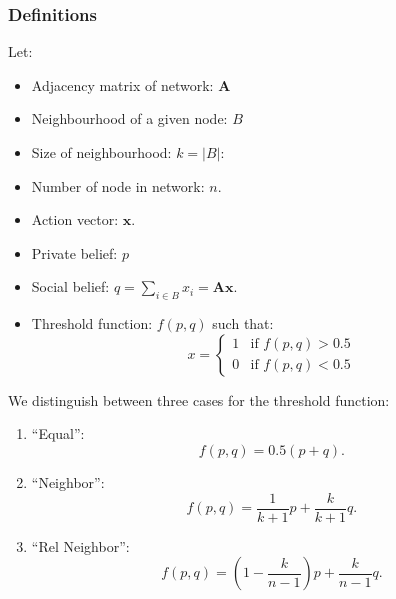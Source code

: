 \documentclass[10pt,a4paper]{article}
\author{Christoph Aymanns}
\begin{document}
\subsubsection*{Definitions}
Let:
\begin{itemize}
\item Adjacency matrix of network: $\mathbf{A}$
\item Neighbourhood of a given node: $B$ 
\item Size of neighbourhood: $k =|B|$: 
\item Number of node in network: $n$.
\item Action vector: $\mathbf{x}$.
\item Private belief: $p$ 
\item Social belief: $q = \sum_{i \in B} x_i = \mathbf{A} \mathbf{x}$. 
\item Threshold function: $f(p,q)$ such that:
\begin{equation}
x = \begin{cases} 1 &\mbox{if } f(p,q) > 0.5  \\
0 & \mbox{if } f(p,q) < 0.5 \end{cases}
\end{equation}
\end{itemize}
We distinguish between three cases for the threshold function:
\begin{enumerate}
\item ``Equal'':
\begin{equation}
f(p,q) = 0.5(p+q).
\end{equation}
\item ``Neighbor'':
\begin{equation}
f(p,q) = \frac{1}{k+1}p + \frac{k}{k+1}q.
\end{equation}
\item ``Rel Neighbor'':
\begin{equation}
f(p,q) = \left(1 - \frac{k}{n-1}\right) p + \frac{k}{n-1}q.
\end{equation}
\end{enumerate}
\end{document}
